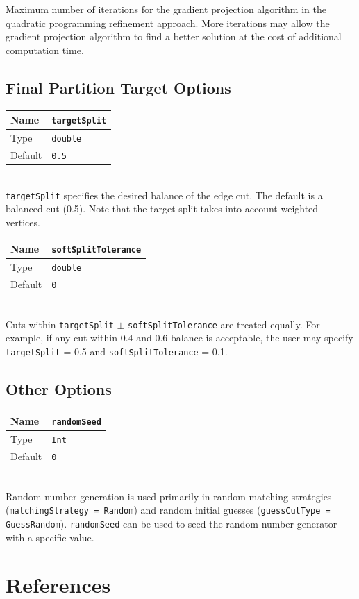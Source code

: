 \documentclass[letter]{article}
\begin{document}
Maximum number of iterations for the gradient projection algorithm in the quadratic programming refinement approach. More iterations may allow the gradient projection algorithm to find a better solution at the cost of additional computation time.

\subsection{Final Partition Target Options}

\begin{tabular}{|l|l|} \hline
Name & \texttt{targetSplit} \\ \hline
Type & \texttt{double} \\ \hline
Default & \texttt{0.5} \\ \hline
\end{tabular}\\

\texttt{targetSplit} specifies the desired balance of the edge cut. The default is a balanced cut (0.5). Note that the target split takes into account weighted vertices.\\
\baselineskip
\begin{tabular}{|l|l|} \hline
Name & \texttt{softSplitTolerance} \\ \hline
Type & \texttt{double} \\ \hline
Default & \texttt{0} \\ \hline
\end{tabular}\\

Cuts within \texttt{targetSplit} $\pm$ \texttt{softSplitTolerance} are treated equally. For example, if any cut within 0.4 and 0.6 balance is acceptable, the user may specify \texttt{targetSplit} = 0.5 and \texttt{softSplitTolerance} = 0.1.\\

\subsection{Other Options}

\begin{tabular}{|l|l|} \hline
Name & \texttt{randomSeed} \\ \hline
Type & \texttt{Int} \\ \hline
Default & \texttt{0} \\ \hline
\end{tabular}\\

Random number generation is used primarily in random matching strategies (\texttt{matchingStrategy = Random}) and random initial guesses (\texttt{guessCutType = GuessRandom}). \texttt{randomSeed} can be used to seed the random number generator with a specific value.

\section{References}





\printindex
\end{document}
